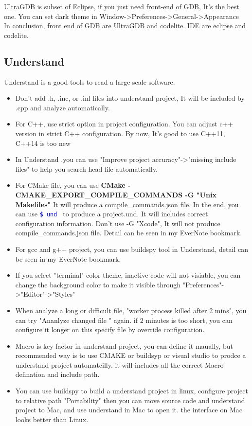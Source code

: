 \documentclass[a4paper,12pt,twoside]{book}
\newcommand{\linuxcommand}[1]{\texttt{\textcolor{blue}{\$ #1 \Pisymbol{psy}{191}}}}
\begin{document}
UltraGDB is subset of Eclipse, if you just need front-end of GDB, It's the best one. You can set dark theme in Window->Preferences->General->Appearance \\

In conclusion,  front end of GDB are UltraGDB and codelite. IDE are eclipse and codelite.

\subsection{Understand}
Understand is a good tools to read a large scale software. 
\begin{itemize}
\item Don't add .h, .inc, or .inl files into understand project, It will be included by .cpp and analyze automatically. 
\item For C++, use strict option in project configuration. You can adjust c++ version in strict C++ configuration. By now, It's good to use C++11, C++14 is too new
\item In Understand ,you can use "Improve project accuracy"->"missing include files" to help you search head file automatically. 
\item For CMake file, you can use \textbf{CMake -CMAKE\_EXPORT\_COMPILE\_COMMANDS -G "Unix Makefiles"} It will produce a compile\_commands.json file. In the end, you can use \linuxcommand{und} to produce a project.und. It will includes correct configuration information.  Don't use -G "Xcode", It will not produce  compile\_commands.json file.  Detail can be seen in my EverNote bookmark. 
\item For gcc and g++ project, you can use buildspy tool in Understand, detail can be seen in my EverNote bookmark.
\item If you select "terminal" color theme, inactive code will not visiable, you can change the background color to make it visible through "Preferences"->"Editor"->"Styles"
\item When analyze a long or difficult file, "worker process killed after 2 mins", you can try "Ananlyze changed file " again. if 2 minutes is too short, you can configure it longer on this specify file by override configuration. 
\item Macro is key factor in understand project, you can define it maually, but recommended way is to use CMAKE or buildsyp or visual studio to prodce a understand project automatcilly. it will includes all the correct Macro defination and include path. 
\item You can use buildspy to build a understand project in linux, configure project to relative path "Portability" then you can move source code and understand project to Mac, and use understand in Mac to open it. the interface on Mac looks better than Linux. 


\end{itemize}
\end{document}
